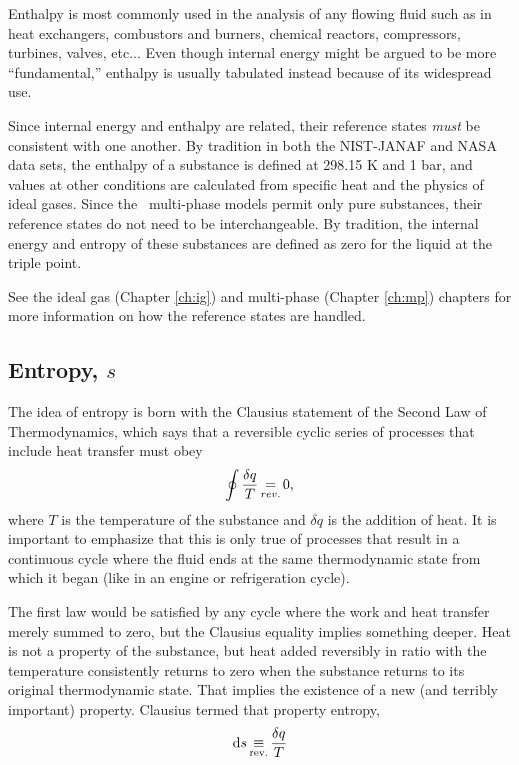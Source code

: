 Enthalpy is most commonly used in the analysis of any flowing fluid such as in heat exchangers, combustors and burners, chemical reactors, compressors, turbines, valves, etc...  Even though internal energy might be argued to be more ``fundamental,'' enthalpy is usually tabulated instead because of its widespread use.

Since internal energy and enthalpy are related, their reference states \emph{must} be consistent with one another.  By tradition in both the NIST-JANAF and NASA data sets, the enthalpy of a substance is defined at 298.15 K and 1 bar, and values at other conditions are calculated from specific heat and the physics of ideal gases.  Since the \PM\ multi-phase models permit only pure substances, their reference states do not need to be interchangeable.  By tradition, the internal energy and entropy of these substances are defined as zero for the liquid at the triple point.

See the ideal gas (Chapter \ref{ch:ig}) and multi-phase (Chapter \ref{ch:mp}) chapters for more information on how the reference states are handled.

\subsection{Entropy, $s$}\label{sec:intro:s}

The idea of entropy is born with the Clausius statement of the Second Law of Thermodynamics, which says that a reversible cyclic series of processes that include heat transfer must obey
\begin{align}
\oint \frac{\delta q}{T} \operatorname*{=}_{rev.} 0,
\end{align}
where $T$ is the temperature of the substance and $\delta q$ is the addition of heat.  It is important to emphasize that this is only true of processes that result in a continuous cycle where the fluid ends at the same thermodynamic state from which it began (like in an engine or refrigeration cycle).

The first law would be satisfied by any cycle where the work and heat transfer merely summed to zero, but the Clausius equality implies something deeper.  Heat is not a property of the substance, but heat added reversibly in ratio with the temperature consistently returns to zero when the substance returns to its original thermodynamic state.  That implies the existence of a new (and terribly important) property.  Clausius termed that property entropy,
\begin{align}
\mathrm{d} s \operatorname*{\equiv}_\mathrm{rev.} \frac{\delta q}{T}\label{eqn:intro:s}
\end{align}

